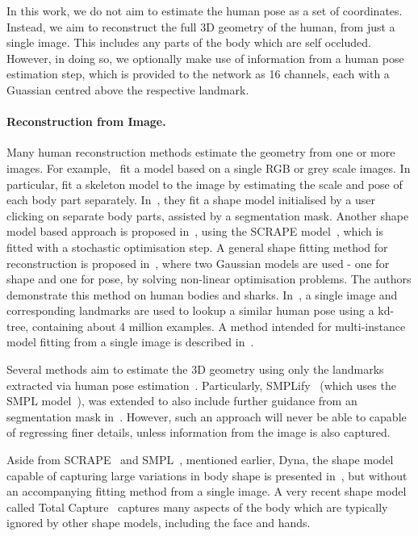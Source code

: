 In this work, we do not aim to estimate the human pose as a set of
coordinates. Instead, we aim to reconstruct the full 3D geometry of
the human, from just a single image. This includes any parts of the
body which are self occluded. However, in doing so, we optionally make
use of information from a human pose estimation step, which is
provided to the network as 16 channels, each with a Guassian centred
above the respective landmark.


\paragraph{Reconstruction from Image.} Many human reconstruction
methods estimate the geometry from one or more images. For
example,~\cite{balan2007detailed,grest2005human,guan2009estimating}
fit a model based on a single RGB or grey scale images. In particular,
\cite{grest2005human} fit a skeleton model to the image by estimating
the scale and pose of each body part
separately. In~\cite{guan2009estimating}, they fit a shape model
initialised by a user clicking on separate body parts, assisted by a
segmentation mask. Another shape model based approach is proposed
in~\cite{balan2007detailed}, using the SCRAPE
model~\cite{anguelov2005scape}, which is fitted with a stochastic
optimisation step. A general shape fitting method for reconstruction
is proposed in~\cite{chen2010inferring}, where two Gaussian models are
used - one for shape and one for pose, by solving non-linear
optimisation problems. The authors demonstrate this method on human
bodies and sharks. In~\cite{jiang20103d}, a single image and
corresponding landmarks are used to lookup a similar human pose using
a kd-tree, containing about 4 million examples. A method intended for
multi-instance model fitting from a single image is described
in~\cite{Zanfir_2018_CVPR}.

Several methods aim to estimate the 3D geometry using only the
landmarks extracted via human pose
estimation~\cite{bogo2016smplify,ramakrishna2012reconstructing}. Particularly,
SMPLify~\cite{bogo2016smplify} (which uses the SMPL
model~\cite{loper2015smpl}), was extended to also include further
guidance from an segmentation mask
in~\cite{varol2017learning}. However, such an approach will never be
able to capable of regressing finer details, unless information from
the image is also captured.

Aside from SCRAPE~\cite{anguelov2005scape} and
SMPL~\cite{loper2015smpl}, mentioned earlier, Dyna, the shape model
capable of capturing large variations in body shape is presented
in~\cite{Dyna:SIGGRAPH:2015}, but without an accompanying fitting
method from a single image. A very recent shape model called Total
Capture~\cite{Joo_2018_CVPR} captures many aspects of the body which
are typically ignored by other shape models, including the face and
hands.

